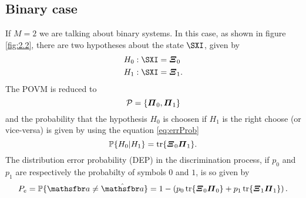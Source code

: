     \subsection{Binary case}
    If $M=2$ we are talking about binary systems. In this case, as shown in figure \ref{fig:2.2}, 
    there are two hypotheses about the state $\Operator{\sXi}$,
    given by
    \begin{subequations}\begin{align}
        H_0 &: \Operator{\sXi}=\Operator{\varXi}_0\\
        H_1 &: \Operator{\sXi}=\Operator{\varXi}_1.
        \label{eq:binHyp}
    \end{align}\end{subequations}
    The POVM is reduced to
    \begin{equation}
        \mathcal{P}=\{\Operator{\varPi}_0,\Operator{\varPi}_1\}
    \end{equation}
    and the probability that the hypothesis $H_0$ is choosen
    if $H_1$ is the right choose (or vice-versa) is given by using the equation \ref{eq:errProb}
    \begin{equation}
        \mathbb{P}\{H_0|H_1\}=\tr{\Operator{\varXi}_0\Operator{\varPi}_1}.
    \end{equation}
    The distribution error probability (DEP) in the discrimination process, if $p_0$ and $p_1$ are 
    respectively the probabilty of symbols $0$ and $1$, is so given by
    \begin{equation}
        P_e=\mathbb{P}\{\msf{a}\ne\hat{\msf{a}}\} =
        1-\left(p_0 \tr{\Operator{\varXi}_0\Operator{\varPi}_0}+p_1 \tr{\Operator{\varXi}_1\Operator{\varPi}_1}\right).
    \end{equation}

